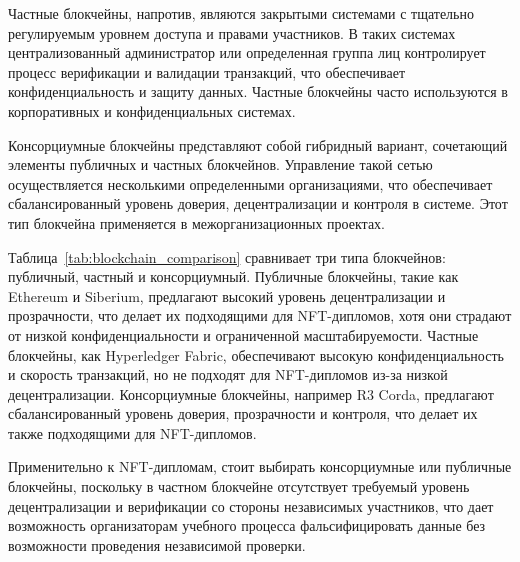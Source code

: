 Частные блокчейны, напротив, являются закрытыми системами с тщательно регулируемым уровнем доступа и правами участников. В таких системах централизованный администратор или определенная группа лиц контролирует процесс верификации и валидации транзакций, что обеспечивает конфиденциальность и защиту данных. Частные блокчейны часто используются в корпоративных и конфиденциальных системах.

Консорциумные блокчейны представляют собой гибридный вариант, сочетающий элементы публичных и частных блокчейнов. Управление такой сетью осуществляется несколькими определенными организациями, что обеспечивает сбалансированный уровень доверия, децентрализации и контроля в системе. Этот тип блокчейна применяется в межорганизационных проектах.

Таблица~\ref{tab:blockchain_comparison} сравнивает три типа блокчейнов: публичный, частный и консорциумный. Публичные блокчейны, такие как Ethereum и Siberium, предлагают высокий уровень децентрализации и прозрачности, что делает их подходящими для NFT-дипломов, хотя они страдают от низкой конфиденциальности и ограниченной масштабируемости. Частные блокчейны, как Hyperledger Fabric, обеспечивают высокую конфиденциальность и скорость транзакций, но не подходят для NFT-дипломов из-за низкой децентрализации. Консорциумные блокчейны, например R3 Corda, предлагают сбалансированный уровень доверия, прозрачности и контроля, что делает их также подходящими для NFT-дипломов.

Применительно к NFT-дипломам, стоит выбирать консорциумные или публичные блокчейны, поскольку в частном блокчейне отсутствует требуемый уровень децентрализации и верификации со стороны независимых участников, что дает возможность организаторам учебного процесса фальсифицировать данные без возможности проведения независимой проверки.

